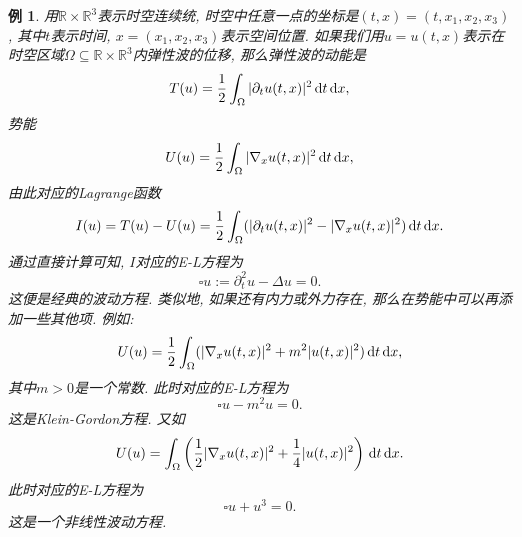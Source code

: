 \documentclass[12pt,a4paper]{article}
\newtheorem{example}[theorem]{例}
\begin{document}
\begin{example}
    用$\mathbb{R} \times \mathbb{R}^3$表示时空连续统, 时空中任意一点的坐标是$(t, x) = (t, x_1, x_2, x_3)$, 其中$t$表示时间, $x = (x_1, x_2, x_3)$表示空间位置.
    如果我们用$u = u(t, x)$表示在时空区域$\Omega \subseteq \mathbb{R} \times \mathbb{R}^3$内弹性波的位移, 那么弹性波的动能是 
    \begin{equation*}
        T(u) = \frac{1}{2}\int_{\Omega}|\partial_tu(t, x)|^2 \,{\rm d}t\,{\rm d}x, 
    \end{equation*}
    势能 
    \begin{equation*}
        U(u) =  \frac{1}{2}\int_{\Omega}|\nabla_xu(t, x)|^2 \,{\rm d}t\,{\rm d}x,
    \end{equation*}
    由此对应的Lagrange函数 
    \begin{equation*}
        I(u) = T(u) - U(u) = \frac{1}{2}\int_{\Omega}(|\partial_tu(t, x)|^2 - |\nabla_xu(t, x)|^2) \,{\rm d}t\,{\rm d}x. 
    \end{equation*}
    通过直接计算可知, $I$对应的E-L方程为 
    \begin{equation*}
        \square u := \partial_t^2u - \Delta u = 0.
    \end{equation*}
    这便是经典的波动方程. 类似地, 如果还有内力或外力存在, 那么在势能中可以再添加一些其他项. 例如:
    \begin{equation*}
        U(u) =  \frac{1}{2}\int_{\Omega}(|\nabla_xu(t, x)|^2 + m^2|u(t, x)|^2) \,{\rm d}t\,{\rm d}x,
    \end{equation*} 
    其中$m > 0$是一个常数. 此时对应的E-L方程为
    \begin{equation*}
        \square u - m^2u = 0.
    \end{equation*} 
    这是Klein-Gordon方程. 又如
    \begin{equation*}
        U(u) =  \int_{\Omega}\left(\frac{1}{2}|\nabla_xu(t, x)|^2 +\frac{1}{4} |u(t, x)|^2\right) \,{\rm d}t\,{\rm d}x.
    \end{equation*} 
    此时对应的E-L方程为 
    \begin{equation*}
        \square u + u^3 = 0.
    \end{equation*}
    这是一个非线性波动方程.
\end{example}
\end{document}
